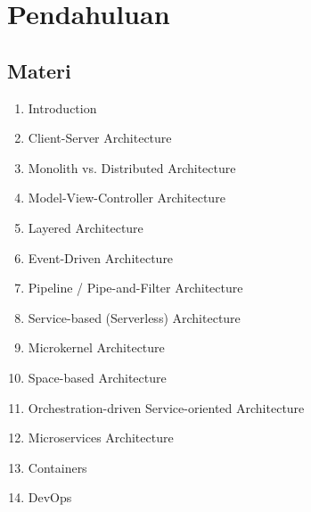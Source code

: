 \chapter{Pendahuluan}

\section{Materi}
\begin{enumerate}
\item Introduction
\item Client-Server Architecture
\item Monolith vs. Distributed Architecture
\item Model-View-Controller Architecture
\item Layered Architecture
\item Event-Driven Architecture
\item Pipeline / Pipe-and-Filter Architecture
\item Service-based (Serverless) Architecture
\item Microkernel Architecture
\item Space-based Architecture
\item Orchestration-driven Service-oriented Architecture
\item Microservices Architecture
\item Containers
\item DevOps
\end{enumerate}

